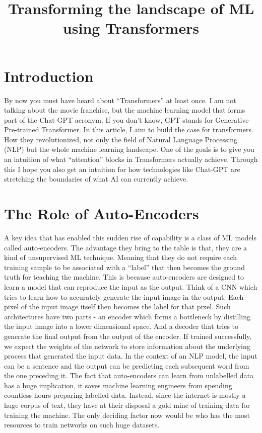 \documentclass{../template/texnote}
\title{\textbf{Transforming the landscape of ML using Transformers}}[author={Linn Abraham}]
\begin{document}
    \maketitle {}

\section{Introduction}
By now you must have heard about ``Transformers'' at least once. I am not talking about the movie franchise, but the machine learning model that forms part of the Chat-GPT acronym. 
If you don't know, GPT stands for Generative Pre-trained Transformer. 
In this article, I aim to build the case for transformers. How they revolutionized, not only the field of Natural Language Processing (NLP) but the whole machine learning landscape.
One of the goals is to give you an intuition of what ``attention'' blocks in Transformers actually achieve.
Through this I hope you also get an intuition for how technologies like Chat-GPT are stretching the boundaries of what AI can currently achieve.

\section{The Role of Auto-Encoders}
A key idea that has enabled this sudden rise of capability is a class of ML models called auto-encoders.
The advantage they bring to the table is that, they are a kind of unsupervised ML technique. 
Meaning that they do not require each training sample to be associated with a ``label'' that then becomes the ground truth for teaching the machine.
This is because auto-encoders are designed to learn a model that can reproduce the input as the output.
Think of a CNN which tries to learn how to accurately generate the input image in the output.
Each pixel of the input image itself then becomes the label for that pixel.
Such architectures have two parts - an encoder which forms a bottleneck by distilling the input image into a lower dimensional space.
And a decoder that tries to generate the final output from the output of the encoder.
If trained successfully, we expect the weights of the network to store information about the underlying process that generated the input data.
In the context of an NLP model, the input can be a sentence and the output can be predicting each subsequent word from the one preceding it.
The fact that auto-encoders can learn from unlabelled data has a huge implication, it saves machine learning engineers from spending countless hours preparing labelled data.
Instead, since the internet is mostly a huge corpus of text, they have at their disposal a gold mine of training data for training the machine.
The only deciding factor now would be who has the most resources to train networks on such huge datasets.
\end{document}
